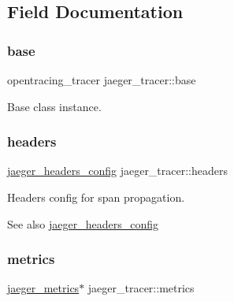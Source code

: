 \subsection{Field Documentation}
\mbox{\label{structjaeger__tracer_a0cb44e6988002ef749df0f3a44a8c6fc}} 
\subsubsection{\texorpdfstring{base}{base}}
{\footnotesize\ttfamily opentracing\+\_\+tracer jaeger\+\_\+tracer\+::base}



Base class instance. 

\mbox{\label{structjaeger__tracer_adfcabc1df77962918610907797229e0d}} 
\subsubsection{\texorpdfstring{headers}{headers}}
{\footnotesize\ttfamily \mbox{\hyperlink{structjaeger__headers__config}{jaeger\+\_\+headers\+\_\+config}} jaeger\+\_\+tracer\+::headers}



Headers config for span propagation. 

\begin{DoxySeeAlso}{See also}
\mbox{\hyperlink{structjaeger__headers__config}{jaeger\+\_\+headers\+\_\+config}} 
\end{DoxySeeAlso}
\mbox{\label{structjaeger__tracer_a1dd0f33dd401acec1affee5e74e4ce1a}} 
\subsubsection{\texorpdfstring{metrics}{metrics}\hspace{0.1cm}{\footnotesize\ttfamily [1/2]}}
{\footnotesize\ttfamily \mbox{\hyperlink{structjaeger__metrics}{jaeger\+\_\+metrics}}$\ast$ jaeger\+\_\+tracer\+::metrics}



